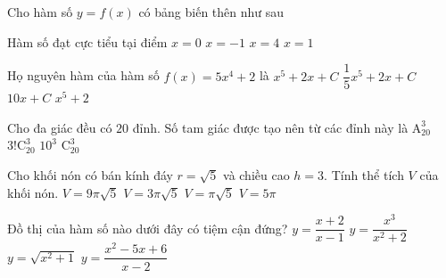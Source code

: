 \begin{ex}%
Cho hàm số $y=f(x)$ có bảng biến thên như sau
\begin{center}
\end{center}
Hàm số đạt cực tiểu tại điểm
\choice
{$x=0$}
{\True $x=-1$}
{$x=4$}
{$x=1$}
\end{ex}

\begin{ex}%
Họ nguyên hàm của hàm số $f(x)=5x^4+2$ là
\choice
{\True $x^5+2x+C$}
{$\dfrac{1}{5}x^5+2x+C$}
{$10x+C$}
{$x^5+2$}
\end{ex}

\begin{ex}%
Cho đa giác đều có $20$ đỉnh. Số tam giác được tạo nên từ các đỉnh này là
\choice
{$\mathrm{A}_{20}^3$}
{$3!\mathrm{C}_{20}^3$}
{$10^3$}
{\True $\mathrm{C}_{20}^3$}
\end{ex}

\begin{ex}%
Cho khối nón có bán kính đáy $r=\sqrt{5}$ và chiều cao $h=3$. Tính thể tích $V$ của khối nón.
\choice
{$V=9\pi\sqrt{5}$}
{$V=3\pi\sqrt{5}$}
{$V=\pi\sqrt{5}$}
{\True $V=5\pi$}
\end{ex}

\begin{ex}%
Đồ thị của hàm số nào dưới đây có tiệm cận đứng?
\choice
{\True $y=\dfrac{x+2}{x-1}$}
{$y=\dfrac{x^3}{x^2+2}$}
{$y=\sqrt{x^2+1}$}
{$y=\dfrac{x^2-5x+6}{x-2}$}
\end{ex}

